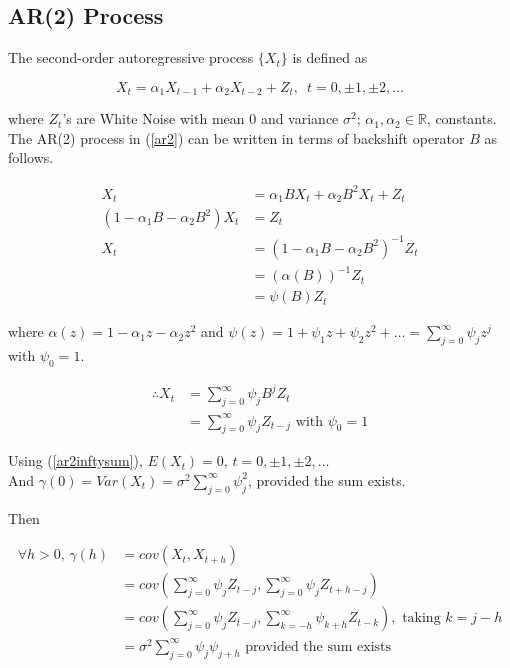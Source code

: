 \documentclass[11pt, a4paper]{article}
\numberwithin{equation}{section}
\theoremstyle{definition}
\begin{document}
\subsection{AR(2) Process}

The second-order autoregressive process $\{X_t\}$ is defined as

\begin{equation}\label{ar2}
X_t = \alpha_1 X_{t-1} + \alpha_2 X_{t-2} + Z_t, \,\,\, t = 0, \pm 1, \pm 2, \ldots
\end{equation}

where $Z_t$'s are White Noise with mean $0$ and variance $\sigma^2$; $\alpha_1, \alpha_2 \in \mathbb{R}$, constants. \\

The AR(2) process in (\ref{ar2}) can be written in terms of backshift operator $B$ as follows.

\begin{align*}
X_t &= \alpha_1 BX_t + \alpha_2 B^2 X_t + Z_t \\[0.25em]
\left( 1- \alpha_1 B - \alpha_2 B^2 \right) X_t &= Z_t \\[0.25em]
X_t &= \left( 1- \alpha_1 B - \alpha_2 B^2 \right)^{-1} Z_t \\[0.25em]
&= \left( \alpha (B) \right)^{-1} Z_t \\[0.25em]
&= \psi(B) Z_t
\end{align*}

where $\alpha (z) = 1 - \alpha_1 z - \alpha_2 z^2$ and $\psi(z) = 1 + \psi_1 z + \psi_2 z^2 + \ldots = \sum \limits_{j = 0}^{\infty} \psi_j z^j$ with $\psi_0 = 1$.


\begin{align}\label{ar2inftysum}
\therefore X_t &= \sum \limits_{j = 0}^{\infty} \psi_j B^j Z_t \nonumber \\[0.25em]
&= \sum \limits_{j = 0}^{\infty} \psi_j Z_{t-j} \,\, \text{with } \psi_0 = 1
\end{align}

Using (\ref{ar2inftysum}), $E(X_t) = 0$, $t = 0, \pm 1, \pm 2, \ldots$ \\

And $\gamma(0) = Var(X_t) = \sigma^2 \sum \limits_{j = 0}^{\infty} \psi_{j}^{2}$, provided the sum exists. \\

\newpage

Then

\begin{align*}
\forall h > 0, \, \gamma(h) &= cov(X_t, X_{t+h}) \\[0.25em]
&= cov\left(\sum \limits_{j = 0}^{\infty} \psi_j Z_{t-j}, \sum \limits_{j = 0}^{\infty} \psi_j Z_{t+h-j}\right) \\[0.25em]
&= cov\left(\sum \limits_{j = 0}^{\infty} \psi_j Z_{t-j}, \sum \limits_{k = -h}^{\infty} \psi_{k+h} Z_{t-k}\right), \,\, \text{taking } k = j - h \\[0.25em]
&= \sigma^2 \sum \limits_{j = 0}^{\infty} \psi_j \psi_{j+h} \,\, \text{provided the sum exists}
\end{align*}
\end{document}
